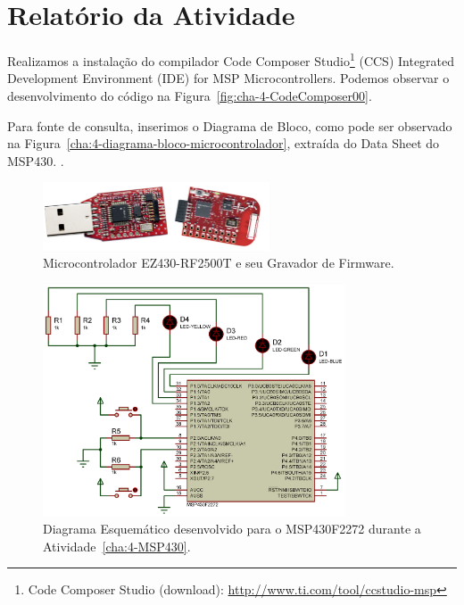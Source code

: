 \documentclass[
	12pt,				%
	openright,			%
  oneside,     %
	a4paper,			%
	english,			%
	french,				%
	spanish,			%
	brazil				%
	]{abntex2}
\begin{document}

\section{Relatório da Atividade} %
\label{sec:consideracoes}

Realizamos a instalação do compilador Code Composer Studio\footnote{Code Composer Studio (download): \url{http://www.ti.com/tool/ccstudio-msp}} (CCS) Integrated Development Environment (IDE) for MSP Microcontrollers. Podemos observar o desenvolvimento do código na Figura~\ref{fig:cha-4-CodeComposer00}.

Para fonte de consulta, inserimos o Diagrama de Bloco, como pode ser observado na Figura~\ref{cha:4-diagrama-bloco-microcontrolador}, extraída do Data Sheet do MSP430. \cite{Instruments2012}.

\begin{figure}[!ht]
  \centering
  \caption{\label{fig:03e04MicrocontroladorEZ430-RF2500T}Microcontrolador EZ430-RF2500T e seu Gravador de Firmware.}  
  \includegraphics[width=0.6\textwidth]{images/Atividade04/03e04MicrocontroladorEZ430-RF2500T.jpg}
\end{figure}

\begin{figure}[ht]
  \centering
  \caption{\label{fig:Atividade-04-05-Schematic-01-recortado}Diagrama Esquemático desenvolvido para o MSP430F2272 durante a Atividade~\ref{cha:4-MSP430}.}
  \includegraphics[width=0.8\textwidth]{images/Atividade04/Atividade-04-05-Schematic-01-recortado.png}
\end{figure}
\end{document}
